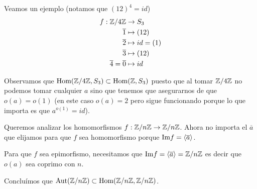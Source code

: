 \begin{ej}
	Veamos un ejemplo (notamos que $(12)^4 = id$)
	\begin{align*}
	f:\mathbb{Z}/4\mathbb{Z} &\to S_3 \\
	\overline{1} &\mapsto (12) \\
	\overline{2} &\mapsto id = (1) \\
	\overline{3} &\mapsto (12) \\
	\overline{4} = \overline{0} &\mapsto id
	\end{align*}
	
	Observamos que $\text{Hom}(\mathbb{Z}/4\mathbb{Z}, S_3) \subset \text{Hom}(\mathbb{Z}, S_3)$ puesto que al tomar $\mathbb{Z}/4\mathbb{Z}$ no podemos tomar cualquier $a$ sino que tenemos que asegurarnos de que $o(a) = o(1)$ (en este caso $o(a) = 2$ pero sigue funcionando porque lo que importa es que $a^{o(1)} = id$).
\end{ej}

Queremos analizar los homomorfismos $f:\mathbb{Z}/n\mathbb{Z} \to \mathbb{Z}/n\mathbb{Z}$. Ahora no importa el $\overline{a}$ que elijamos para que $f$ sea homomorfismo porque $\text{Im} f = \langle \overline{a} \rangle$. 

Para que $f$ sea epimorfismo, necesitamos que $\text{Im} f = \langle \overline{a} \rangle = \mathbb{Z}/n\mathbb{Z}$ es decir que $o(a)$ sea coprimo con $n$.

Concluímos que $\text{Aut}(\mathbb{Z}/n\mathbb{Z}) \subset \text{Hom}(\mathbb{Z}/n\mathbb{Z}, \mathbb{Z}/n\mathbb{Z})$.